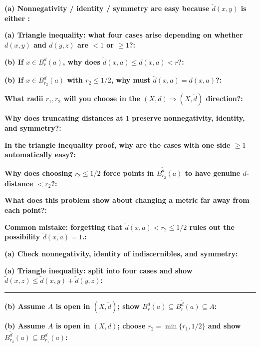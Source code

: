 \documentclass[12pt]{article}
\newcommand{\fillfield}[1]{%
  \par\noindent\textbf{#1:}\enspace\hrulefill\par\vspace{3pt}%
}
\newcommand{\writespace}[1]{\vspace{#1}}
\begin{document}
\bigskip

\begin{tcolorbox}[
  enhanced, breakable,
  colback  = pass2yellow,
  colframe = yellow!65!black,
  fonttitle = \bfseries,
  title = {Pass 2 \enspace\textbf{--}\enspace Proof Recipe Card}
]
\fillfield{(a) Nonnegativity / identity / symmetry are easy because $\tilde d(x,y)$ is either \dotfill}
\fillfield{(a) Triangle inequality: what four cases arise depending on whether $d(x,y)$ and $d(y,z)$ are $<1$ or $\ge 1$?}
\fillfield{(b) If $x \in B_r^d(a)$, why does $\tilde d(x,a)\le d(x,a)<r$?}
\fillfield{(b) If $x \in B_{r_2}^{\tilde d}(a)$ with $r_2 \le 1/2$, why must $\tilde d(x,a)=d(x,a)$?}
\fillfield{What radii $r_1,r_2$ will you choose in the $(X,d)\Rightarrow(X,\tilde d)$ direction?}
\end{tcolorbox}

\bigskip

\begin{tcolorbox}[
  enhanced, breakable,
  colback  = pass3orange,
  colframe = orange!65!black,
  fonttitle = \bfseries,
  title = {Pass 3 \enspace\textbf{--}\enspace Self-Explanation}
]
\fillfield{Why does truncating distances at $1$ preserve nonnegativity, identity, and symmetry?}
\fillfield{In the triangle inequality proof, why are the cases with one side $\ge 1$ automatically easy?}
\fillfield{Why does choosing $r_2 \le 1/2$ force points in $B_{r_2}^{\tilde d}(a)$ to have genuine $d$-distance $<r_2$?}
\fillfield{What does this problem show about changing a metric far away from each point?}
\fillfield{Common mistake: forgetting that $\tilde d(x,a)<r_2\le 1/2$ rules out the possibility $\tilde d(x,a)=1$.}
\end{tcolorbox}

\newpage

\begin{tcolorbox}[
  enhanced, breakable,
  colback  = pass4purple,
  colframe = purple!55!black,
  fonttitle = \bfseries,
  title = {Pass 4 \enspace\textbf{--}\enspace Skeleton Proof}
]
\noindent\textbf{(a) Check nonnegativity, identity of indiscernibles, and symmetry:}\par
\writespace{1.6cm}
\noindent\textbf{(a) Triangle inequality: split into four cases and show $\tilde d(x,z)\le \tilde d(x,y)+\tilde d(y,z)$:}\par
\writespace{2.2cm}

\noindent\rule{\linewidth}{0.4pt}\vspace{2pt}

\noindent\textbf{(b) Assume $A$ is open in $(X,\tilde d)$; show $B_r^d(a)\subseteq B_r^{\tilde d}(a)\subseteq A$:}\par
\writespace{1.5cm}
\noindent\textbf{(b) Assume $A$ is open in $(X,d)$; choose $r_2=\min\{r_1,1/2\}$ and show $B_{r_2}^{\tilde d}(a)\subseteq B_{r_1}^d(a)$:}\par
\writespace{1.8cm}
\end{tcolorbox}
\end{document}
